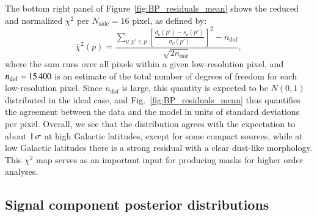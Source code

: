 \documentclass{aa}
\def\,{\thinspace}
\begin{document}
The bottom right panel of Figure~\ref{fig:BP_residuals_mean} shows the
reduced and normalized $\chi^2$ per $N_{\mathrm{side}}=16$ pixel, as
defined by:
\begin{equation}
  \bar{\chi}^2(p) = \frac{\sum_{\nu,p'\in p} \left[\frac{d_{\nu}(p')-s_{\nu}(p')}{\sigma_{\nu}(p')}\right]^2 -n_{\mathrm{dof}}}{\sqrt{2n_{\mathrm{dof}}}},
\end{equation}
where the sum runs over all pixels within a given low-resolution
pixel, and $n_{\mathrm{dof}}=15\,400$ is an estimate of the total
number of degrees of freedom for each low-resolution pixel. Since
$n_{\mathrm{dof}}$ is large, this quantity is expected to be $N(0,1)$
distributed in the ideal case, and Fig.~\ref{fig:BP_residuals_mean} thus
quantifies the agreement between the data and the model in units of
standard deviations per pixel. Overall, we see that the distribution
agrees with the expectation to about $1\,\sigma$ at high Galactic
latitudes, except for some compact sources, while at low Galactic
latitudes there is a strong residual with a clear dust-like
morphology. This $\chi^2$ map serves as an important input for
producing masks for higher order analyses. 

\subsection{Signal component posterior distributions}
\label{sec:diffuse_comp}
\end{document}
